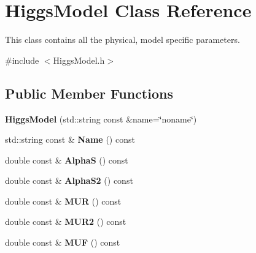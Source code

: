 \hypertarget{classHiggsModel}{}\section{Higgs\+Model Class Reference}
\label{classHiggsModel}


This class contains all the physical, model specific parameters.  




{\ttfamily \#include $<$Higgs\+Model.\+h$>$}

\subsection*{Public Member Functions}
\begin{DoxyCompactItemize}
\item 
\hypertarget{classHiggsModel_aa6f39f73df22008fa639fd64653cc8e2}{}{\bfseries Higgs\+Model} (std\+::string const \&name=\char`\"{}noname\char`\"{})\label{classHiggsModel_aa6f39f73df22008fa639fd64653cc8e2}

\item 
\hypertarget{classHiggsModel_a29a94aee623c9ce8d874b8b4fba17835}{}std\+::string const \& {\bfseries Name} () const \label{classHiggsModel_a29a94aee623c9ce8d874b8b4fba17835}

\item 
\hypertarget{classHiggsModel_a343a0ea0a7a22e78c3504dc64d4d6184}{}double const \& {\bfseries Alpha\+S} () const \label{classHiggsModel_a343a0ea0a7a22e78c3504dc64d4d6184}

\item 
\hypertarget{classHiggsModel_a41c108f3545d39dbb23835d781a163ee}{}double const \& {\bfseries Alpha\+S2} () const \label{classHiggsModel_a41c108f3545d39dbb23835d781a163ee}

\item 
\hypertarget{classHiggsModel_aca6071e5666fa030cacb0a11efaa1f22}{}double const \& {\bfseries M\+U\+R} () const \label{classHiggsModel_aca6071e5666fa030cacb0a11efaa1f22}

\item 
\hypertarget{classHiggsModel_a2f76729834fcbab6bb0b8c8595c05983}{}double const \& {\bfseries M\+U\+R2} () const \label{classHiggsModel_a2f76729834fcbab6bb0b8c8595c05983}

\item 
\hypertarget{classHiggsModel_a24085f73b5e2858e86db20470f8e5c9f}{}double const \& {\bfseries M\+U\+F} () const \label{classHiggsModel_a24085f73b5e2858e86db20470f8e5c9f}


\end{DoxyCompactItemize}
